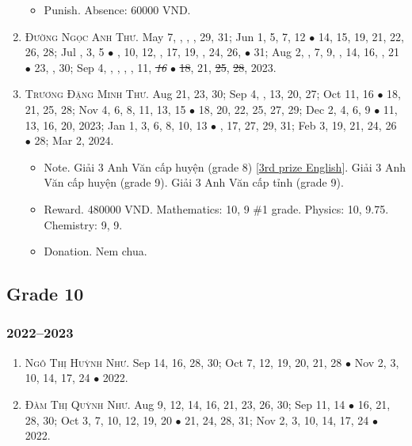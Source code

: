 \documentclass{article}
\begin{document}
\begin{enumerate}
	\begin{itemize}
		\item {\sf Punish.} Absence: 60000 VND.
	\end{itemize}
	\item \textsc{Đường Ngọc Anh Thư.} May 7, , , , 29, 31; Jun 1, 5, 7, 12 $\bullet$ 14, 15, 19, 21, 22, 26, 28; Jul , 3, 5 $\bullet$ , 10, 12, , 17, 19, , 24, 26,  $\bullet$ 31; Aug 2, , 7, 9, , 14, 16, , 21 $\bullet$ 23, , 30; Sep 4, , , , , 11, \st{\it16} $\bullet$ \st{18}, 21, \st{25}, \st{28}, 2023. {\sf[Out]}
	\item \textsc{Trương Đặng Minh Thư.} Aug 21, 23, 30; Sep 4, , 13, 20, 27; Oct 11, 16 $\bullet$ 18, 21, 25, 28; Nov 4, 6, 8, 11, 13, 15 $\bullet$ 18, 20, 22, 25, 27, 29; Dec 2, 4, 6, 9 $\bullet$ 11, 13, 16, 20, 2023; Jan 1, 3, 6, 8, 10, 13 $\bullet$ , 17, 27, 29, 31; Feb 3, 19, 21, 24, 26 $\bullet$ 28; Mar 2, 2024.
	\begin{itemize}
		\item {\sf Note.} Giải 3 Anh Văn cấp huyện (grade 8) [\href{https://github.com/NQBH/hobby/blob/master/STEM/student/TDMT_3rd_prize_English.jpg}{3rd prize English}]. Giải 3 Anh Văn cấp huyện (grade 9). Giải 3 Anh Văn cấp tỉnh (grade 9).
		\item {\sf Reward.} 480000 VND. Mathematics: 10, 9 \#1 grade. Physics: 10, 9.75. Chemistry: 9, 9.
		\item {\sf Donation.} Nem chua.
	\end{itemize}
\end{enumerate}


\subsection{Grade 10}

\subsubsection{2022--2023}

\begin{enumerate}
	\item \textsc{Ngô Thị Huỳnh Như.} {\sf[In]} Sep 14, 16, 28, 30; Oct 7, 12, 19, 20, 21, 28 $\bullet$ Nov 2, 3, 10, 14, 17, 24 $\bullet$ 2022. {\sf[Out]}
	\item \textsc{Đàm Thị Quỳnh Như.} {\sf[In]} Aug 9, 12, 14, 16, 21, 23, 26, 30; Sep 11, 14 $\bullet$ 16, 21, 28, 30; Oct 3, 7, 10, 12, 19, 20 $\bullet$ 21, 24, 28, 31; Nov 2, 3, 10, 14, 17, 24 $\bullet$ 2022. {\sf[Out]}
\end{enumerate}
\end{document}
